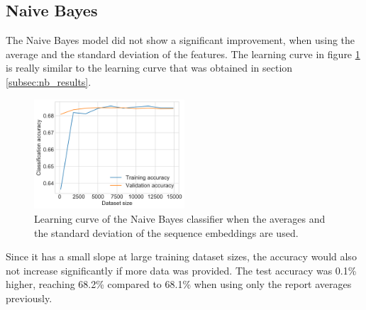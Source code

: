 \subsection{Naive Bayes}
The Naive Bayes model did not show a significant improvement, when using the average and the standard deviation of the features.
The learning curve in figure \ref{figure:nb_learning_std} is really similar to the learning curve that was obtained in section \ref{subsec:nb_results}.
\begin{figure}[h]
    \centering
    \includegraphics[width=0.5\textwidth]{figures/charts/training_with_std/nb_learning.png}
    \caption{Learning curve of the Naive Bayes classifier when the averages and the standard deviation of the sequence embeddings are used.}
    \label{figure:nb_learning_std}
\end{figure}
Since it has a small slope at large training dataset sizes, the accuracy would also not increase significantly if more data was provided.
The test accuracy was 0.1\% higher, reaching 68.2\% compared to 68.1\% when using only the report averages previously.

